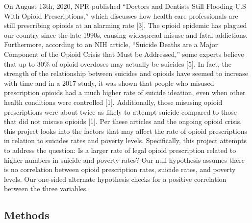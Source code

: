 \documentclass[
]{article}
\begin{document}
On August 13th, 2020, NPR published ``Doctors and Dentists Still
Flooding U.S With Opioid Prescriptions,'' which discusses how health
care professionals are still prescribing opioids at an alarming rate
{[}3{]}. The opioid epidemic has plagued our country since the late
1990s, causing widespread misuse and fatal addictions. Furthermore,
according to an NIH article, ``Suicide Deaths are a Major Component of
the Opioid Crisis that Must be Addressed,'' some experts believe that up
to 30\% of opioid overdoses may actually be suicides {[}5{]}. In fact,
the strength of the relationship between suicides and opioids have
seemed to increase with time and in a 2017 study, it was shown that
people who misused prescription opioids had a much higher rate of
suicide ideation, even when other health conditions were controlled
{[}1{]}. Additionally, those misusing opioid prescriptions were about
twice as likely to attempt suicide compared to those that did not misuse
opioids {[}1{]}. Per these articles and the ongoing opioid crisis, this
project looks into the factors that may affect the rate of opioid
prescriptions in relation to suicides rates and poverty levels.
Specifically, this project attempts to address the question: Is a larger
rate of legal opioid prescription related to higher numbers in suicide
and poverty rates? Our null hypothesis assumes there is no correlation
between opioid prescription rates, suicide rates, and poverty levels.
Our one-sided alternate hypothesis checks for a positive correlation
between the three variables.

\hypertarget{methods}{%
\subsection{Methods}\label{methods}}
\end{document}
